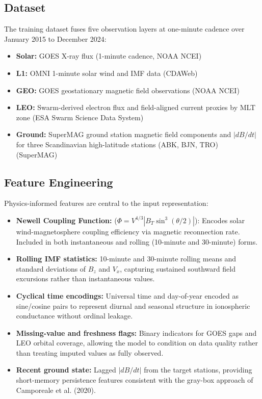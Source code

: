 \documentclass{article}
\begin{document}
\subsection*{Dataset}
The training dataset fuses five observation layers at one-minute cadence over January 2015 to December 2024:
\begin{itemize}
  \item \textbf{Solar:} GOES X-ray flux (1-minute cadence, NOAA NCEI)
  \item \textbf{L1:} OMNI 1-minute solar wind and IMF data (CDAWeb)
  \item \textbf{GEO:} GOES geostationary magnetic field observations (NOAA NCEI)
  \item \textbf{LEO:} Swarm-derived electron flux and field-aligned current proxies by MLT zone (ESA Swarm Science Data System)
  \item \textbf{Ground:} SuperMAG ground station magnetic field components and $|dB/dt|$ for three Scandinavian high-latitude stations (ABK, BJN, TRO) (SuperMAG)
\end{itemize}

\subsection*{Feature Engineering}
Physics-informed features are central to the input representation:
\begin{itemize}
  \item \textbf{Newell Coupling Function:} ($\Phi = V^{4/3} |B_T \sin^3(\theta/2)|$): Encodes solar wind-magnetosphere coupling efficiency via magnetic reconnection rate. Included in both instantaneous and rolling (10-minute and 30-minute) forms.
  \item \textbf{Rolling IMF statistics:} 10-minute and 30-minute rolling means and standard deviations of $B_z$ and $V_x$, capturing sustained southward field excursions rather than instantaneous values.
  \item \textbf{Cyclical time encodings:} Universal time and day-of-year encoded as sine/cosine pairs to represent diurnal and seasonal structure in ionospheric conductance without ordinal leakage.
  \item \textbf{Missing-value and freshness flags:} Binary indicators for GOES gaps and LEO orbital coverage, allowing the model to condition on data quality rather than treating imputed values as fully observed.
  \item \textbf{Recent ground state:} Lagged $|dB/dt|$ from the target stations, providing short-memory persistence features consistent with the gray-box approach of Camporeale et al. (2020).
\end{itemize}
\end{document}
